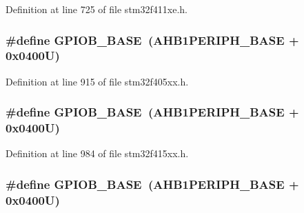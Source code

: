 Definition at line 725 of file stm32f411xe.\+h.

\subsubsection[{\texorpdfstring{G\+P\+I\+O\+B\+\_\+\+B\+A\+SE}{GPIOB_BASE}}]{\setlength{\rightskip}{0pt plus 5cm}\#define G\+P\+I\+O\+B\+\_\+\+B\+A\+SE~({\bf A\+H\+B1\+P\+E\+R\+I\+P\+H\+\_\+\+B\+A\+SE} + 0x0400\+U)}\hypertarget{group___peripheral__registers__structures_gac944a89eb789000ece920c0f89cb6a68}{}\label{group___peripheral__registers__structures_gac944a89eb789000ece920c0f89cb6a68}


Definition at line 915 of file stm32f405xx.\+h.

\subsubsection[{\texorpdfstring{G\+P\+I\+O\+B\+\_\+\+B\+A\+SE}{GPIOB_BASE}}]{\setlength{\rightskip}{0pt plus 5cm}\#define G\+P\+I\+O\+B\+\_\+\+B\+A\+SE~({\bf A\+H\+B1\+P\+E\+R\+I\+P\+H\+\_\+\+B\+A\+SE} + 0x0400\+U)}\hypertarget{group___peripheral__registers__structures_gac944a89eb789000ece920c0f89cb6a68}{}\label{group___peripheral__registers__structures_gac944a89eb789000ece920c0f89cb6a68}


Definition at line 984 of file stm32f415xx.\+h.

\subsubsection[{\texorpdfstring{G\+P\+I\+O\+B\+\_\+\+B\+A\+SE}{GPIOB_BASE}}]{\setlength{\rightskip}{0pt plus 5cm}\#define G\+P\+I\+O\+B\+\_\+\+B\+A\+SE~({\bf A\+H\+B1\+P\+E\+R\+I\+P\+H\+\_\+\+B\+A\+SE} + 0x0400\+U)}\hypertarget{group___peripheral__registers__structures_gac944a89eb789000ece920c0f89cb6a68}{}\label{group___peripheral__registers__structures_gac944a89eb789000ece920c0f89cb6a68}


